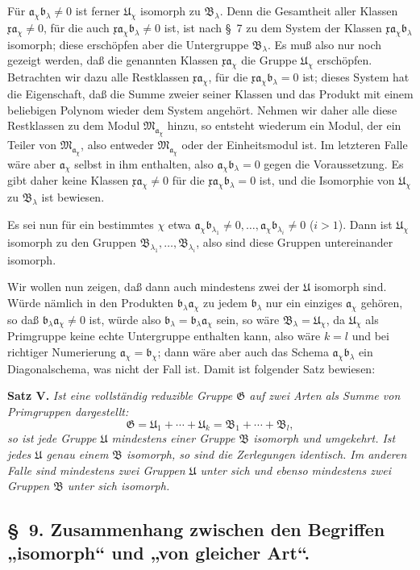 \documentclass[11pt]{article}
\newcommand{\mM}{\mathfrak{M}}
\newcommand{\mG}{\mathfrak{G}}
\newcommand{\mB}{\mathfrak{B}}
\newcommand{\ma}{\mathfrak{a}}
\newcommand{\mb}{\mathfrak{b}}
\newcommand{\mx}{\mathfrak{x}}
\providecommand{\mU}{\mathfrak{U}}
\begin{document}
Für $\ma_\chi\mb_\lambda\ne0$ ist ferner $\mU_\chi$ isomorph zu $\mB_\lambda$. Denn die Gesamtheit aller Klassen $\mx\ma_\chi\ne0$, für die auch $\mx\ma_\chi\mb_\lambda\ne0$ ist, ist nach \S~7 zu dem System der Klassen $\mx\ma_\chi\mb_\lambda$ isomorph; diese erschöpfen aber die Untergruppe $\mB_\lambda$. Es muß also nur noch gezeigt werden, daß die genannten Klassen $\mx\ma_\chi$ die Gruppe $\mU_\chi$ erschöpfen. Betrachten wir dazu alle Restklassen $\mx\ma_\chi$, für die $\mx\ma_\chi\mb_\lambda=0$ ist; dieses System hat die Eigenschaft, daß die Summe zweier seiner Klassen und das Produkt mit einem beliebigen Polynom wieder dem System angehört. Nehmen wir daher alle diese Restklassen zu dem Modul $\mM_{\ma_\chi}$ hinzu, so entsteht wiederum ein Modul, der ein Teiler von $\mM_{\ma_\chi}$, also entweder $\mM_{\ma_\chi}$ oder der Einheitsmodul ist. Im letzteren Falle wäre aber $\ma_\chi$ selbst in ihm enthalten, also $\ma_\chi\mb_\lambda=0$ gegen die Voraussetzung. Es gibt daher keine Klassen $\mx\ma_\chi\ne0$ für die $\mx\ma_\chi\mb_\lambda=0$ ist, und die Isomorphie von $\mU_\chi$ zu $\mB_\lambda$ ist bewiesen.

Es sei nun für ein bestimmtes $\chi$ etwa $\ma_\chi\mb_{\lambda_1}\ne0,
\ldots,\ma_\chi\mb_{\lambda_i}\ne0$ ($i>1$). Dann ist $\mU_\chi$ isomorph zu den Gruppen $\mB_{\lambda_1},\ldots,\mB_{\lambda_i}$, also sind diese Gruppen untereinander isomorph.

Wir wollen nun zeigen, daß dann auch mindestens zwei der $\mU$ isomorph sind. Würde nämlich in den Produkten $\mb_\lambda\ma_\chi$ zu jedem $\mb_\lambda$ nur ein einziges $\ma_\chi$ gehören, so daß $\mb_\lambda\ma_\chi\ne0$ ist, würde also $\mb_\lambda=\mb_\lambda\ma_\chi$ sein, so wäre $\mB_\lambda=\mU_\chi$, da $\mU_\chi$ als Primgruppe keine echte Untergruppe enthalten kann, also wäre $k=l$ und bei richtiger Numerierung $\ma_\chi=\mb_\chi$; dann wäre aber auch das Schema $\ma_\chi\mb_\lambda$ ein Diagonalschema, was nicht der Fall ist. Damit ist folgender Satz bewiesen:

\textbf{Satz V.} \emph{Ist eine vollständig reduzible Gruppe $\mG$ auf zwei Arten als Summe von Primgruppen dargestellt:
\[
 \mG=\mU_1+\cdots+\mU_k=\mB_1+\cdots+\mB_l,
\]
so ist jede Gruppe $\mU$ mindestens einer Gruppe $\mB$ isomorph und umgekehrt. Ist jedes $\mU$ genau einem $\mB$ isomorph, so sind die Zerlegungen identisch. Im anderen Falle sind mindestens zwei Gruppen $\mU$ unter sich und ebenso mindestens zwei Gruppen $\mB$ unter sich isomorph.}

\subsection*{\S~9. Zusammenhang zwischen den Begriffen „isomorph“ und „von gleicher Art“.}
\end{document}

